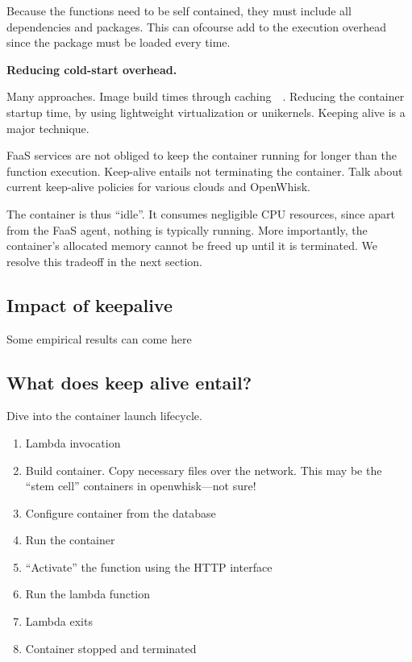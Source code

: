 Because the functions need to be self contained, they must include all dependencies and packages.
%
This can ofcourse add to the execution overhead since the package must be loaded every time. 





\textbf{Reducing cold-start overhead.}

Many approaches. Image build times through caching~\cite{openlamda}~\cite{sock}.
%
Reducing the container startup time, by using lightweight virtualization or unikernels.
%
Keeping alive is a major technique.
%


FaaS services are not obliged to keep the container running for longer than the function execution.
%
Keep-alive entails not terminating the container.
%
Talk about current keep-alive policies for various clouds and OpenWhisk. 

%
The container is thus ``idle''.
%
It consumes negligible CPU resources, since apart from the FaaS agent, nothing is typically running.
%
More importantly, the container's allocated memory cannot be freed up until it is terminated.
%
We resolve this tradeoff in the next section. 





\subsection{Impact of keepalive}

Some empirical results can come here 


\subsection{What does keep alive entail?}

Dive into the container launch lifecycle.


\begin{enumerate}
\item Lambda invocation
\item Build container. Copy necessary files over the network. This may be the ``stem cell'' containers in openwhisk---not sure!
\item Configure container from the database
\item Run the container
\item  ``Activate'' the function using the HTTP interface
\item Run the lambda function 
\item Lambda exits
\item Container stopped and terminated
\end{enumerate}


